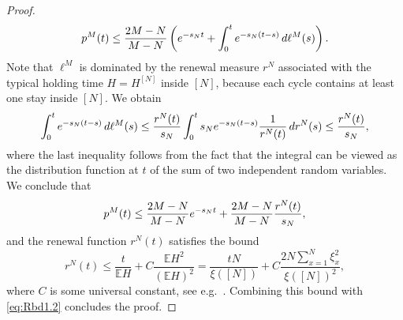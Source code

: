 \documentclass[11pt,a4paper]{scrartcl}
\numberwithin{equation}{section}
\theoremstyle{plain}
\theoremstyle{definition}
\theoremstyle{remark}
\newcommand{\bE}{\ensuremath{\mathbb{E}}}
\newcommand{\di}{\,\textup{d}}
\begin{document}
\begin{proof}
\begin{equation}\label{eq:Rbd1.1}
	p^M(t) \leq \frac{2M-N}{M-N}\left( \textup{e}^{-s_Nt}+\int_{0}^t \textup{e}^{-s_N(t-s)} \di \ell^{M}(s)\right).
\end{equation}
Note that $\ell^M$ is dominated by the renewal measure $r^N$ associated with the typical holding time $H=H^{[N]}$ inside $[N]$, because each cycle contains at least one stay inside $[N]$. We obtain 
$$
\int_{0}^t \textup{e}^{-s_N(t-s)} \di \ell^{M}(s)\leq \frac{r^N(t)}{s_N}\int_{0}^t s_N \textup{e}^{-s_N(t-s)} \frac{1}{r^N(t)}\di r^{N}(s)\leq \frac{r^N(t)}{s_N},
$$
where the last inequality follows from the fact that the integral can be viewed as the distribution function at $t$ of the sum of two independent random variables. We conclude that
\begin{equation}\label{eq:Rbd1.2}
	p^M(t)\leq \frac{2M-N}{M-N}\textup{e}^{-s_Nt}+\frac{2M-N}{M-N}\frac{r^N(t)}{s_N},
\end{equation}
and the renewal function $r^N(t)$ satisfies the bound
$$
r^N(t)\leq \frac{t}{\bE H}+ C \frac{\bE H^2}{(\bE H)^2}= \frac{tN}{\xi([N])}+ C\frac{2N\sum_{x=1}^N \xi_x^2}{\xi([N])^2},
$$
where $C$ is some universal constant, see e.g.\ \cite{Daley76}. Combining this bound with \eqref{eq:Rbd1.2} concludes the proof.
\end{proof}
\end{document}
